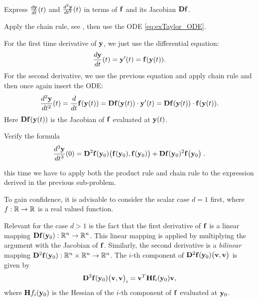 \begin{problem}
\begin{subproblem}[3] \label{subprb:TaylorODE_1}     %
Express $\frac{d{\mathbf{y}}}{dt}(t)$ and $\frac{d^{2}{\mathbf{y}}}{dt^{2}}(t)$ in terms of ${\mathbf{f}}$ and its Jacobian ${\mathbf{D}}{\mathbf{f}}$.

\begin{hint}
Apply the chain rule, see , then use the ODE \eqref{eq:exTaylor_ODE}.
\end{hint}

\begin{solution}
For the first time derivative of ${\mathbf{y}}$, we just use the differential equation:
$$\frac{d{\mathbf{y}}}{dt}(t) = {\mathbf{y}}'(t) = {\mathbf{f}}({\mathbf{y}}(t)).$$ 
For the second derivative, we use the previous equation and apply chain rule and then once again insert the ODE:
\begin{equation*}
\frac{d^2{\mathbf{y}}}{dt^2}(t) = \frac{d}{dt}{\mathbf{f}}({\mathbf{y}}(t)) = {\mathbf{D}}{\mathbf{f}}({\mathbf{y}}(t))\cdot{\mathbf{y}}'(t) = {\mathbf{D}}{\mathbf{f}}({\mathbf{y}}(t))\cdot{\mathbf{f}}({\mathbf{y}}(t)).
\end{equation*}
Here ${\mathbf{D}}{\mathbf{f}}({\mathbf{y}}(t))$ is the Jacobian of ${\mathbf{f}}$ evaluated at ${\mathbf{y}}(t)$.
\end{solution}
\end{subproblem}


\begin{subproblem}[5] \label{subprb:TaylorODE_2}     %
Verify the formula 
\begin{gather} \label{eq:exTaylor3deriv}
\frac{d^{3}{\mathbf{y}}}{dt^{3}}(0) =   {\mathbf{D}}^{2}{\mathbf{f}}({\mathbf{y}}_{0})\big({\mathbf{f}}({\mathbf{y}}_{0}),{\mathbf{f}}({\mathbf{y}}_{0})\big) + {\mathbf{D}}{\mathbf{f}}({\mathbf{y}}_{0})^{2}{\mathbf{f}}\big({\mathbf{y}}_{0}\big)\;.
\end{gather}

\begin{hint}
this time we have to apply both the product rule  and chain rule  to the expression derived in the previous sub-problem.
\end{hint}

To gain confidence, it is advisable to consider the scalar case $d=1$ first, where $f:\mathbb{R}\to\mathbb{R}$ is a real valued function. 

Relevant for the case $d>1$ is the fact that the first derivative of ${\mathbf{f}}$ is a linear mapping ${\mathbf{D}}{\mathbf{f}}({\mathbf{y}}_{0}): \mathbb{R}^n\to \mathbb{R}^n$.
This linear mapping is applied by multiplying the argument with the Jacobian of ${\mathbf{f}}$.
Similarly, the second derivative is a \textit{bilinear} mapping ${\mathbf{D}}^{2}{\mathbf{f}}({\mathbf{y}}_{0}): \mathbb{R}^n\times \mathbb{R}^n\to \mathbb{R}^n$.
The $i$-th component of ${\mathbf{D}}^{2}{\mathbf{f}}({\mathbf{y}}_{0})\big({\mathbf{v}}, {\mathbf{v}}\big)$ is given by
\begin{equation*}
{\mathbf{D}}^{2}{\mathbf{f}}({\mathbf{y}}_{0})\big({\mathbf{v}}, {\mathbf{v}}\big)_i = {\mathbf{v}}^T {\mathbf{H}}{\mathbf{f}}_i({\mathbf{y}}_{0}){\mathbf{v}},
\end{equation*}
where ${\mathbf{H}} f_i({\mathbf{y}}_{0})$ is the Hessian of the $i$-th component of ${\mathbf{f}}$ evaluated at ${\mathbf{y}}_{0}$.


\end{subproblem}
\end{problem}
